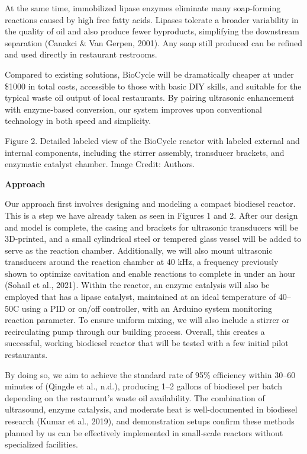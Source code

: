 \documentclass[10pt,twocolumn]{article}
\begin{document}
At the same time, immobilized lipase enzymes eliminate many soap-forming reactions caused by high free fatty acids. Lipases tolerate a broader variability in the quality of oil and also produce fewer byproducts, simplifying the downstream separation (Canakci \& Van Gerpen, 2001). Any soap still produced can be refined and used directly in restaurant restrooms.

Compared to existing solutions, BioCycle will be dramatically cheaper at under \$1000 in total costs, accessible to those with basic DIY skills, and suitable for the typical waste oil output of local restaurants. By pairing ultrasonic enhancement with enzyme-based conversion, our system improves upon conventional technology in both speed and simplicity.  

Figure 2. Detailed labeled view of the BioCycle reactor with labeled external and internal components, including the stirrer assembly, transducer brackets, and enzymatic catalyst chamber. Image Credit: Authors.

\textbf{Approach}

Our approach first involves designing and modeling a compact biodiesel reactor. This is a step we have already taken as seen in Figures 1 and 2. After our design and model is complete, the casing and brackets for ultrasonic transducers will be 3D-printed, and a small cylindrical steel or tempered glass vessel will be added to serve as the reaction chamber. Additionally, we will also mount ultrasonic transducers around the reaction chamber at 40 kHz, a frequency previously shown to optimize cavitation and enable reactions to complete in under an hour (Sohail et al., 2021). Within the reactor, an enzyme catalysis will also be employed that has a lipase catalyst, maintained at an ideal temperature of 40–50\degree C using a PID or on/off controller, with an Arduino system monitoring reaction parameter. To ensure uniform mixing, we will also include a stirrer or recirculating pump through our building process. Overall, this creates a successful, working biodiesel reactor that will be tested with a few initial pilot restaurants. 

By doing so, we aim to achieve the standard rate of 95\% efficiency within 30–60 minutes of (Qingde et al., n.d.), producing 1–2 gallons of biodiesel per batch depending on the restaurant's waste oil availability. The combination of ultrasound, enzyme catalysis, and moderate heat is well-documented in biodiesel research (Kumar et al., 2019), and demonstration setups confirm these methods planned by us can be effectively implemented in small-scale reactors without specialized facilities.
\end{document}
